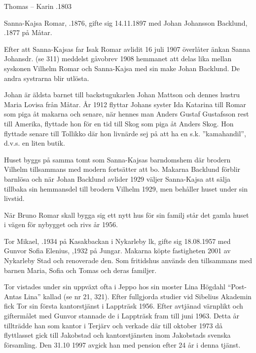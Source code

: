 Thomas   --  Karin .1803






Sanna-Kajsa Romar, .1876, gifte sig 14.11.1897 med Johan Johansson Backlund, .1877 på Måtar.

Efter att Sanna-Kajsas far Isak Romar avlidit 16 juli 1907 överlåter änkan Sanna Johansdr. (se 311) meddelst gåvobrev 1908 hemmanet att delas lika mellan syskonen Vilhelm Romar och Sanna-Kajsa med sin make Johan Backlund. De andra systrarna blir utlösta.

Johan är äldsta barnet till backstugukarlen Johan Mattson och dennes hustru Maria Lovisa från Måtar. År 1912 flyttar Johans syster Ida Katarina till Romar som piga åt makarna och senare, när hennes man Anders Gustaf Gustafsson rest till Amerika, flyttade hon för en tid
till Skog som piga åt Anders Skog. Hon flyttade senare till Tollikko där hon livnärde sej på att ha en s.k. ”kamahandil”, d.v.s. en liten butik.

Huset byggs på samma tomt som Sanna-Kajsas barndomshem där brodern Vilhelm tillsammans med modern fortsätter att bo. Makarna Backlund förblir barnlösa och när Johan Backlund avlider 1929 väljer Sanna-Kajsa att sälja tillbaka sin hemmansdel till brodern Vilhelm 1929, men behåller huset under sin livstid.

När Bruno Romar skall bygga sig ett nytt hus för sin familj står det gamla huset i vägen för nybygget och rivs år 1956.






Tor Mikael, .1934 på Kasakbackan i Nykarleby lk, gifte sig 18.08.1957 med Gunvor Sofia Elenius, ,1932 på Jungar. Makarna köpte fastigheten 2001 av Nykarleby Stad och renoverade den. Som fritidshus används den tillsammans med barnen Maria,
Sofia och Tomas och deras familjer.

Tor vistades under sin uppväxt ofta i Jeppo hos sin moster Lina Högdahl ``Post-Antas Lina'' kallad (se nr 21, 321). Efter fullgjorda studier vid Sibelius Akademin fick Tor sin första kantorstjänst i Lappträsk 1956. Efter avtjänad värnplikt och giftermålet med Gunvor stannade de i Lappträsk fram till juni 1963. Detta år tillträdde han som kantor i Terjärv och verkade där till oktober 1973 då flyttlasset gick till Jakobstad och kantorstjänsten inom Jakobstads svenska församling. Den 31.10 1997 avgick han med pension efter 24 år i denna tjänst.

